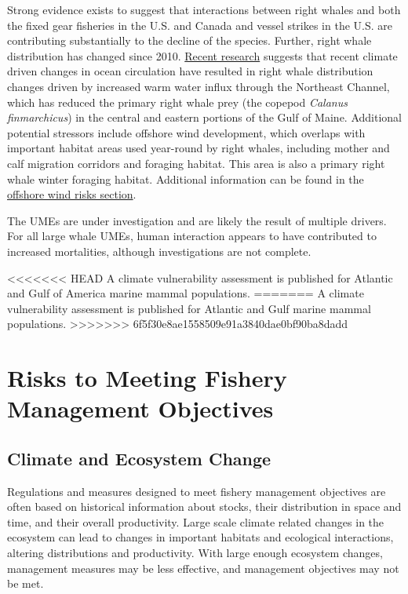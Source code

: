 \documentclass[
  10pt,
]{article}
\begin{document}
Strong evidence exists to suggest that interactions between right whales and both the fixed gear fisheries in the U.S. and Canada and vessel strikes in the U.S. are contributing substantially to the decline of the species. Further, right whale distribution has changed since 2010. \href{https://noaa-edab.github.io/catalog/narw.html}{Recent research} suggests that recent climate driven changes in ocean circulation have resulted in right whale distribution changes driven by increased warm water influx through the Northeast Channel, which has reduced the primary right whale prey (the copepod \emph{Calanus finmarchicus}) in the central and eastern portions of the Gulf of Maine. Additional potential stressors include offshore wind development, which overlaps with important habitat areas used year-round by right whales, including mother and calf migration corridors and foraging habitat. This area is also a primary right whale winter foraging habitat. Additional information can be found in the \protect\hyperlink{other-ocean-uses-offshore-wind}{offshore wind risks section}.

The UMEs are under investigation and are likely the result of multiple drivers. For all large whale UMEs, human interaction appears to have contributed to increased mortalities, although investigations are not complete.

\textless\textless\textless\textless\textless\textless\textless{} HEAD
A climate vulnerability assessment is published for Atlantic and Gulf of America marine mammal populations.
=======
A climate vulnerability assessment is published for Atlantic and Gulf marine mammal populations.
\textgreater\textgreater\textgreater\textgreater\textgreater\textgreater\textgreater{} 6f5f30e8ae1558509e91a3840dae0bf90ba8dadd

\hypertarget{risks-to-meeting-fishery-management-objectives}{%
\section{Risks to Meeting Fishery Management Objectives}\label{risks-to-meeting-fishery-management-objectives}}

\hypertarget{climate-and-ecosystem-change}{%
\subsection{Climate and Ecosystem Change}\label{climate-and-ecosystem-change}}

Regulations and measures designed to meet fishery management objectives are often based on historical information about stocks, their distribution in space and time, and their overall productivity. Large scale climate related changes in the ecosystem can lead to changes in important habitats and ecological interactions, altering distributions and productivity. With large enough ecosystem changes, management measures may be less effective, and management objectives may not be met.
\end{document}
